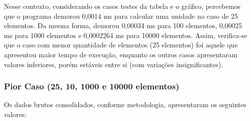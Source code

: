 \documentclass[a4paper, 12pt]{article}
\begin{document}
\vspace{0.8cm}
Nesse contexto, considerando os casos testes da tabela e o gráfico, percebemos que o programa demorou 0,0014 ms para calcular uma unidade no caso de 25 elementos. Da mesma forma, demorou 0,00034 ms para 100 elementos, 0,00025 ms para 1000 elementos e 0,0002264 ms para 10000 elementos. Assim, verifica-se que o caso com menor quantidade de elementos (25 elementos) foi aquele que apresentou maior tempo de execução, enquanto os outros casos apresentaram valores inferiores, porém estáveis entre si (com variações insignificantes).


\subsubsection{Pior Caso (25, 10, 1000 e 10000 elementos)}

Os dados brutos consolidados, conforme metodologia, apresentaram os seguintes valores:
\vspace{0.2cm}
\end{document}
